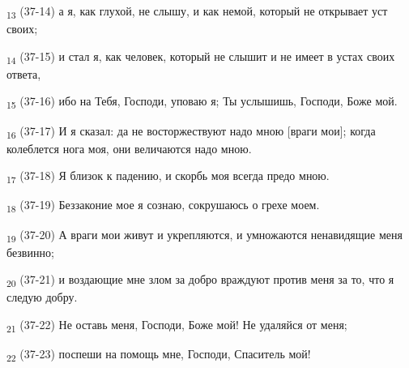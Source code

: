 \begin{tcolorbox}
\textsubscript{13} (37-14) а я, как глухой, не слышу, и как немой, который не открывает уст своих;
\end{tcolorbox}
\begin{tcolorbox}
\textsubscript{14} (37-15) и стал я, как человек, который не слышит и не имеет в устах своих ответа,
\end{tcolorbox}
\begin{tcolorbox}
\textsubscript{15} (37-16) ибо на Тебя, Господи, уповаю я; Ты услышишь, Господи, Боже мой.
\end{tcolorbox}
\begin{tcolorbox}
\textsubscript{16} (37-17) И я сказал: да не восторжествуют надо мною [враги мои]; когда колеблется нога моя, они величаются надо мною.
\end{tcolorbox}
\begin{tcolorbox}
\textsubscript{17} (37-18) Я близок к падению, и скорбь моя всегда предо мною.
\end{tcolorbox}
\begin{tcolorbox}
\textsubscript{18} (37-19) Беззаконие мое я сознаю, сокрушаюсь о грехе моем.
\end{tcolorbox}
\begin{tcolorbox}
\textsubscript{19} (37-20) А враги мои живут и укрепляются, и умножаются ненавидящие меня безвинно;
\end{tcolorbox}
\begin{tcolorbox}
\textsubscript{20} (37-21) и воздающие мне злом за добро враждуют против меня за то, что я следую добру.
\end{tcolorbox}
\begin{tcolorbox}
\textsubscript{21} (37-22) Не оставь меня, Господи, Боже мой! Не удаляйся от меня;
\end{tcolorbox}
\begin{tcolorbox}
\textsubscript{22} (37-23) поспеши на помощь мне, Господи, Спаситель мой!
\end{tcolorbox}
